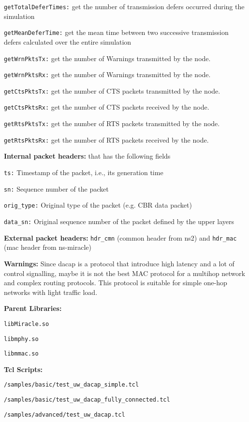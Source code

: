 \begin{description}
\begin{description}
	   \item {\tt getTotalDeferTimes:} get the number of transmission defers occurred during the simulation
	   \item {\tt getMeanDeferTime:} get the mean time between two successive transmission defers calculated over the entire simulation
	   \item {\tt getWrnPktsTx:} get the number of Warnings transmitted by the node.
	   \item {\tt getWrnPktsRx:} get the number of Warnings transmitted by the node.
	   \item {\tt getCtsPktsTx:} get the number of CTS packets transmitted by the node.
	   \item {\tt getCtsPktsRx:} get the number of CTS packets received by the node.
	   \item {\tt getRtsPktsTx:} get the number of RTS packets transmitted by the node.
	   \item {\tt getRtsPktsRx:} get the number of RTS packets received by the node.
   \end{description}
   \item {\bf Internal packet headers:}  that has the following fields
   	\begin{description}
		\item {\tt ts:} Timestamp of the packet, i.e., its generation time	
		\item {\tt sn:} Sequence number of the packet 
		\item {\tt orig\_type:} Original type of the packet (e.g. CBR data packet)
		\item {\tt data\_sn:} Original sequence number of the packet defined by the upper layers
	\end{description}
   \item {\bf External packet headers:}  {\tt hdr\_cmn} (common header from ns2) and  {\tt hdr\_mac} (mac header from ns-miracle)
   \item {\bf Warnings:} Since dacap is a protocol that introduce high latency and a lot of control signalling, maybe it is not the best MAC protocol for a multihop network and complex routing protocols. This protocol is suitable for simple one-hop networks with light traffic load.
   \item {\bf Parent Libraries:}
         \begin{description}
          \item {\tt libMiracle.so}
	       \item {\tt libmphy.so} 
	       \item {\tt libmmac.so}
        \end{description}
   \item {\bf Tcl Scripts:} 
          \begin{description}
	         \item {\tt /samples/basic/test\_uw\_dacap\_simple.tcl} 
	         \item {\tt /samples/basic/test\_uw\_dacap\_fully\_connected.tcl}
            \item {\tt /samples/advanced/test\_uw\_dacap.tcl}
          \end{description}
\end{description}

